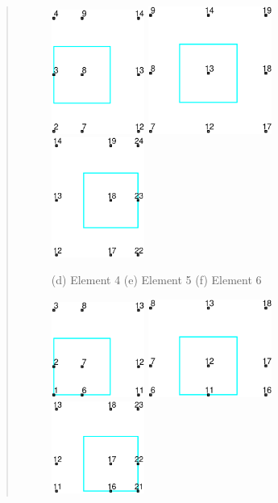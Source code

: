 \begin{quote}
\begin{figure}[!h]
\begin{center}
\centerline{
\includegraphics[width=1.2in]{figs/mesh_e4} \hspace{0.2in}
\includegraphics[width=1.6in]{figs/mesh_e5} \hspace{0.2in}
\includegraphics[width=1.2in]{figs/mesh_e6}
}

\centerline{(d) Element 4 \hspace{0.7in} (e) Element 5 \hspace{0.7in} (f) Element 6}

\centerline{
\includegraphics[width=1.2in]{figs/mesh_e1} \hspace{0.2in}
\includegraphics[width=1.6in]{figs/mesh_e2} \hspace{0.2in}
\includegraphics[width=1.2in]{figs/mesh_e3}
}


\end{center}
\end{figure}
\end{quote}
